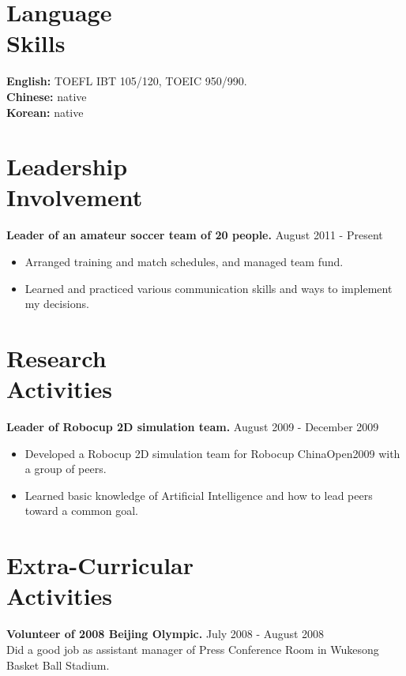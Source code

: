 \documentclass[margin]{res}
\begin{document}
\begin{resume}
 \section{Language \\ Skills} 
				{\bf English:} TOEFL IBT 105/120, TOEIC 950/990. \\
				{\bf Chinese:} native \\
				{\bf Korean: } native	\\	 
 
 \section{Leadership \\ Involvement} 
				{ \bf Leader of an amateur soccer team of 20 people.} \hfill August 2011 - Present \\           
                 \begin{itemize}  \itemsep -2pt %
                 \item Arranged training and match schedules, and managed team fund. 
                \item  Learned and practiced various communication skills and ways to implement my decisions.
                \end{itemize}

\section{Research \\ Activities} 
				{ \bf Leader of Robocup 2D simulation team.} \hfill August 2009 - December 2009 \\  								
                 \begin{itemize}  \itemsep -2pt %
                 \item Developed a Robocup 2D simulation team for Robocup ChinaOpen2009 with a group of peers. 
                \item  Learned basic knowledge of Artificial Intelligence and how to lead peers toward a common goal.
                \end{itemize}

\section{Extra-Curricular \\ Activities} 
				{ \bf Volunteer of 2008 Beijing Olympic.} \hfill July 2008 - August 2008 \\  		
                 Did a good job as assistant manager of Press Conference Room in Wukesong Basket Ball Stadium.
 

\end{resume}
\end{document}
